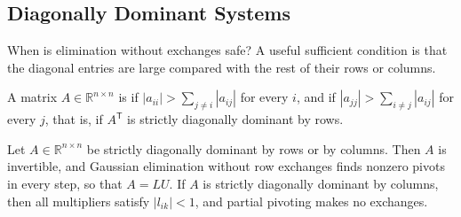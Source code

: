 \subsection{Diagonally Dominant Systems}

When is elimination without exchanges safe? A useful sufficient condition is that the diagonal entries are large compared with the rest of their rows or columns.

\begin{definition}
\label{def:diagonal-dominance}
A matrix $A\in\mathbb R^{n\times n}$ is  if $|a_{ii}|>\sum_{j\ne i}|a_{ij}|$ for every $i$, and  if $|a_{jj}|>\sum_{i\ne j}|a_{ij}|$ for every $j$, that is, if $A^{\mathsf T}$ is strictly diagonally dominant by rows.
\end{definition}

\begin{theorem}
\label{thm:diagonal-dominance}
Let $A\in\mathbb R^{n\times n}$ be strictly diagonally dominant by rows or by columns. Then $A$ is invertible, and Gaussian elimination without row exchanges finds nonzero pivots in every step, so that $A=LU$. If $A$ is strictly diagonally dominant by columns, then all multipliers satisfy $|l_{ik}|<1$, and partial pivoting makes no exchanges.
\end{theorem}

